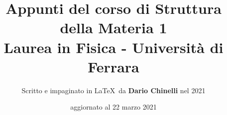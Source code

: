 \documentclass[11pt]{article}
\begin{document}
\title{\textbf{Appunti del corso di Struttura della Materia 1} \\
Laurea in Fisica - Università di Ferrara} 

\author{Scritto e impaginato in \LaTeX\ da \textbf{Dario Chinelli} nel 2021}

\date{aggiornato al 22 marzo 2021}

\maketitle

    \newpage

    \tableofcontents

    
    

    

    

    

    

    

    

    

    
    

    

    
\iffalse
    
    
    
    
    
    
    
    
    
    
    
    
    
\fi
\end{document}

